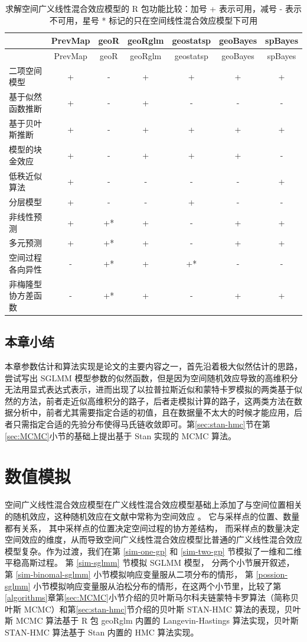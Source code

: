 \documentclass[12pt,a4paper,UTF8,twoside]{book}
\theoremstyle{definition}
\theoremstyle{definition}
\theoremstyle{definition}
\theoremstyle{remark}
\begin{document}
\begin{longtable}[]{@{}lcccccc@{}}
\caption{\label{tab:sglmm-packages} 求解空间广义线性混合效应模型的 R
包功能比较：加号 + 表示可用，减号 - 表示不可用，星号 *
标记的只在空间线性混合效应模型下可用}\tabularnewline
\toprule
& PrevMap & geoR & geoRglm & geostatsp & geoBayes &
spBayes\tabularnewline
\midrule
\endfirsthead
\toprule
& PrevMap & geoR & geoRglm & geostatsp & geoBayes &
spBayes\tabularnewline
\midrule
\endhead
二项空间模型 & + & - & + & + & + & +\tabularnewline
基于似然函数推断 & + & - & + & - & - & -\tabularnewline
基于贝叶斯推断 & + & - & + & + & + & +\tabularnewline
模型的块金效应 & + & - & + & + & + & -\tabularnewline
低秩近似算法 & + & - & - & - & - & +\tabularnewline
分层模型 & + & - & - & + & - & -\tabularnewline
非线性预测 & + & +* & + & - & + & +\tabularnewline
多元预测 & + & +* & + & - & + & +\tabularnewline
空间过程各向异性 & - & +* & + & +* & - & -\tabularnewline
非梅隆型协方差函数 & - & +* & + & - & + & +\tabularnewline
\bottomrule
\end{longtable}

\hypertarget{sec:estimations}{%
\section{本章小结}\label{sec:estimations}}

本章参数估计和算法实现是论文的主要内容之一，首先沿着极大似然估计的思路，尝试写出
SGLMM
模型参数的似然函数，但是因为空间随机效应导致的高维积分无法用显式表达式表示，进而出现了以拉普拉斯近似和蒙特卡罗模拟的两类基于似然的方法，前者走近似高维积分的路子，后者走模拟计算的路子，这两类方法在数据分析中，前者尤其需要指定合适的初值，且在数据量不太大的时候才能应用，后者只需指定合适的先验分布使得马氏链收敛即可。第\ref{sec:stan-hmc}节在第\ref{sec:MCMC}小节的基础上提出基于
Stan 实现的 MCMC 算法。

\hypertarget{simulations}{%
\chapter{数值模拟}\label{simulations}}

空间广义线性混合效应模型在广义线性混合效应模型基础上添加了与空间位置相关的随机效应，这种随机效应在文献中常称为空间效应
\citep{Diggle1998}。 它与采样点的位置、数量都有关系，
其中采样点的位置决定空间过程的协方差结构，
而采样点的数量决定空间效应的维度，从而导致空间广义线性混合效应模型比普通的广义线性混合效应模型复杂。作为过渡，我们在第
\ref{sim-one-gp} 和 \ref{sim-two-gp} 节模拟了一维和二维平稳高斯过程。 第
\ref{sim-sglmm} 节模拟 SGLMM 模型， 分两个小节展开叙述，第
\ref{sim-binomal-sglmm} 小节模拟响应变量服从二项分布的情形， 第
\ref{possion-sglmm}
小节模拟响应变量服从泊松分布的情形，在这两个小节里，比较了第\ref{algorithms}章第\ref{sec:MCMC}小节介绍的贝叶斯马尔科夫链蒙特卡罗算法（简称贝叶斯
MCMC）和第\ref{sec:stan-hmc}节介绍的贝叶斯 STAN-HMC 算法的表现，贝叶斯
MCMC 算法基于 R 包 geoRglm 内置的 Langevin-Hastings 算法实现，贝叶斯
STAN-HMC 算法基于 Stan 内置的 HMC 算法实现。
\end{document}

